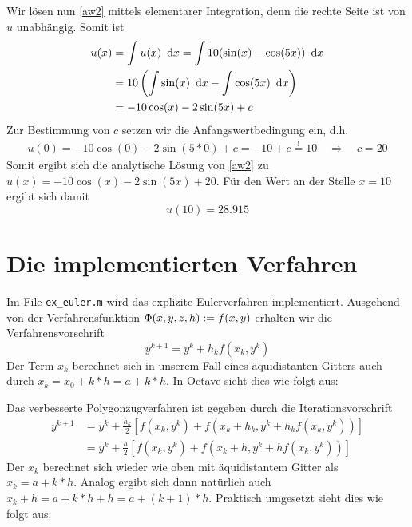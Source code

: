 \documentclass[ %
ngerman, %
a4paper, %
12pt, %
sectionreset, %
chapterstyle=framed, %
sectionstyle=dotted, %
titlefont=osfamily %
]{../../../../texmf/tex/latex/mathscriptMathTUD/mathscriptMathTUD}
\begin{document}
    Wir lösen nun \eqref{aw2} mittels elementarer Integration, denn die rechte Seite ist von $u$ unabhängig. Somit ist
    \begin{align*}
    	u(x) 
    	&= \int u(x) \enskip \mathrm{d}x = \int 10 (\sin(x) - \cos(5x)) \enskip \mathrm{d}x \\
    	&= 10 \left( \int \sin(x) \enskip \mathrm{d}x - \int \cos(5x) \enskip \mathrm{d}x \right)\\
    	&= -10\cos(x) - 2 \sin(5x) + c
    \end{align*}
    Zur Bestimmung von $c$ setzen wir die Anfangswertbedingung ein, d.h.
    \begin{align*}
    	u(0) = -10\cos(0) - 2 \sin(5*0) + c = -10 + c \overset{!}{=} 10 \quad \Longrightarrow \quad c = 20
    \end{align*}
    Somit ergibt sich die analytische Lösung von \eqref{aw2} zu $u(x) = -10 \cos(x) - 2 \sin(5x) + 20$. Für den Wert an der Stelle $x=10$ ergibt sich damit
    \begin{equation*}
    	u(10) = 28.915
    \end{equation*}
    
    \section{Die implementierten Verfahren}
    Im File \texttt{ex\_euler.m} wird das explizite Eulerverfahren implementiert. Ausgehend von der Verfahrensfunktion $\Phi(x,y,z,h) \mathrel{:=} f(x,y)$ erhalten wir die Verfahrensvorschrift
    \begin{equation*}
    	y^{k+1} = y^k + h_k f(x_k, y^k)
    \end{equation*}
    Der Term $x_k$ berechnet sich in unserem Fall eines äquidistanten Gitters auch durch $x_k = x_0 + k * h = a + k*h$.
    In Octave sieht dies wie folgt aus:    
    
    
    Das verbesserte Polygonzugverfahren ist gegeben durch die Iterationsvorschrift
    \begin{align*}
    	y^{k+1} 
    	&= y^k + \frac{h_k}{2} \left[f(x_k, y^k) + f(x_k + h_k , y^k + h_k f(x_k,y^k))\right] \\
    	&= y^k + \frac{h}{2} \left[f(x_k, y^k) + f(x_k + h , y^k + h f(x_k,y^k))\right]
    \end{align*}
    Der $x_k$ berechnet sich wieder wie oben mit äquidistantem Gitter als $x_k = a + k*h$. Analog ergibt sich dann natürlich auch $x_k + h = a + k*h + h = a + (k+1) * h$. 
    Praktisch umgesetzt sieht dies wie folgt aus:
    
   	
\end{document}
